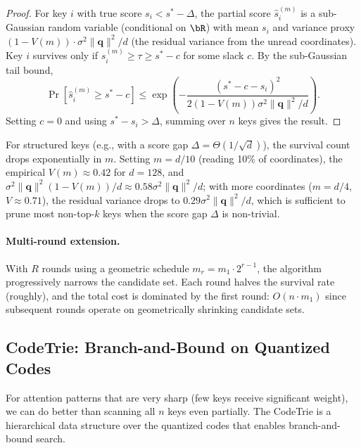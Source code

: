 \documentclass[10pt,twocolumn]{article}
\theoremstyle{definition}
\newcommand{\bq}{\mathbf{q}}
\begin{document}
\begin{proof}
  For key $i$ with true score $s_i < s^* - \Delta$, the partial score
  $\hat{s}_i^{(m)}$ is a sub-Gaussian random variable (conditional on $\bR$)
  with mean $s_i$ and variance proxy $(1 - V(m)) \cdot \sigma^2 \|\bq\|^2 / d$
  (the residual variance from the unread coordinates).  Key $i$ survives only
  if $\hat{s}_i^{(m)} \geq \tau \geq s^* - c$ for some slack $c$.  By the
  sub-Gaussian tail bound,
  \begin{equation}
    \Pr[\hat{s}_i^{(m)} \geq s^* - c]
      \leq \exp\!\left(-\frac{(s^* - c - s_i)^2}{2(1 - V(m))
        \sigma^2 \|\bq\|^2 / d}\right).
  \end{equation}
  Setting $c = 0$ and using $s^* - s_i > \Delta$, summing over $n$ keys gives the result.
\end{proof}

For structured keys (e.g., with a score gap $\Delta = \Theta(1/\sqrt{d})$), the
survival count drops exponentially in $m$.  Setting $m = d/10$ (reading 10\% of
coordinates), the empirical $V(m) \approx 0.42$ for $d = 128$, and
$\sigma^2 \|\bq\|^2 (1 - V(m)) / d \approx 0.58 \sigma^2 \|\bq\|^2 / d$;
with more coordinates ($m = d/4$, $V \approx 0.71$), the residual variance
drops to $0.29 \sigma^2 \|\bq\|^2 / d$, which is sufficient to prune most
non-top-$k$ keys when the score gap $\Delta$ is non-trivial.

\paragraph{Multi-round extension.}
With $R$ rounds using a geometric schedule $m_r = m_1 \cdot 2^{r-1}$, the
algorithm progressively narrows the candidate set.  Each round halves the
survival rate (roughly), and the total cost is dominated by the first round:
$O(n \cdot m_1)$ since subsequent rounds operate on geometrically shrinking
candidate sets.

\subsection{CodeTrie: Branch-and-Bound on Quantized Codes}
\label{sec:codetrie}

For attention patterns that are very sharp (few keys receive significant weight),
we can do better than scanning all $n$ keys even partially.  The CodeTrie is a
hierarchical data structure over the quantized codes that enables branch-and-bound
search.
\end{document}
